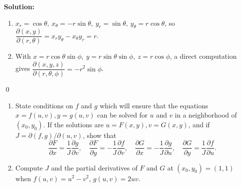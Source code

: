 \noindent\textbf{Solution:}
\begin{enumerate}[label=(\alph*)]
    \item $x_r=\cos\theta,\ x_\theta=-r\sin\theta,\ y_r=\sin\theta,\ y_\theta=r\cos\theta$, so
    $\dfrac{\partial(x,y)}{\partial(r,\theta)}=x_r y_\theta-x_\theta y_r=r$.
    \item With $x=r\cos\theta\sin\phi,\ y=r\sin\theta\sin\phi,\ z=r\cos\phi$, a direct computation gives
    $\dfrac{\partial(x,y,z)}{\partial(r,\theta,\phi)}=-r^2\sin\phi$.
\end{enumerate}\qed


\begin{problembox}
\begin{enumerate}[label=(\alph*)]
    \item State conditions on \( f \) and \( g \) which will ensure that the equations \( x = f(u, v), y = g(u, v) \) can be solved for \( u \) and \( v \) in a neighborhood of \( (x_0, y_0) \). If the solutions are \( u = F(x, y), v = G(x, y) \), and if \( J = \partial (f, g)/\partial (u, v) \), show that
    \[\frac{\partial F}{\partial x} = \frac{1}{J} \frac{\partial g}{\partial v}, \quad \frac{\partial F}{\partial y} = -\frac{1}{J} \frac{\partial f}{\partial v}, \quad \frac{\partial G}{\partial x} = -\frac{1}{J} \frac{\partial g}{\partial u}, \quad \frac{\partial G}{\partial y} = \frac{1}{J} \frac{\partial f}{\partial u}.\]
    \item Compute \( J \) and the partial derivatives of \( F \) and \( G \) at \((x_0, y_0) = (1, 1)\) when \( f(u, v) = u^2 - v^2 \), \( g(u, v) = 2uv \).
\end{enumerate}
\end{problembox}

